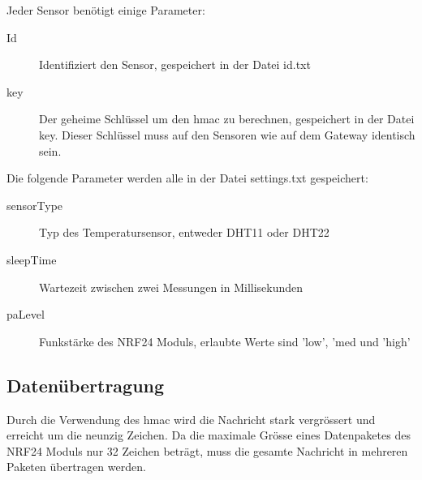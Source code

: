 \documentclass[
  12pt, %
  a4paper, %
  twoside, %
  openany, %
  numbers=noenddot, %
  BCOR=5mm, %
  parskip=half*, %
  thesis, %
]{bfhbook}
\begin{document}
 Jeder Sensor benötigt einige Parameter:
 \begin{description}
\item[Id] Identifiziert den Sensor, gespeichert in der Datei id.txt
\item[key] Der geheime Schlüssel um den \Gls{hmac} zu berechnen, gespeichert in der Datei key. Dieser Schlüssel muss auf den Sensoren wie auf dem Gateway identisch sein.
\end{description}
Die folgende Parameter werden alle in der Datei settings.txt gespeichert:
 \begin{description}
\item[sensorType] Typ des Temperatursensor, entweder DHT11 oder DHT22
\item[sleepTime] Wartezeit zwischen zwei Messungen in Millisekunden
\item[paLevel] Funkstärke des NRF24 Moduls, erlaubte Werte sind 'low', 'med und 'high'
\end{description}

\subsection{Datenübertragung}Durch die Verwendung des \Gls{hmac} wird die Nachricht stark vergrössert und erreicht um die neunzig Zeichen.
Da die maximale Grösse eines Datenpaketes des NRF24 Moduls nur 32 Zeichen beträgt, muss die gesamte Nachricht in mehreren Paketen übertragen werden.
\end{document}
